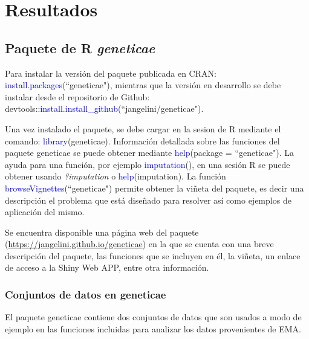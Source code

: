 

\chapter{Resultados}

\section{Paquete de R \emph{geneticae}}

Para instalar la versión del paquete publicada en CRAN: \textcolor{blue}{install.packages}(``geneticae"), mientras que la versión en desarrollo se debe instalar desde el repositorio de Github: devtools::\textcolor{blue}{install.install_github}(``jangelini/geneticae"). 

Una vez instalado el paquete, se debe cargar en la sesion de R mediante el comando: \textcolor{blue}{library}(geneticae). Información detallada sobre las funciones del paquete geneticae se puede obtener mediante \textcolor{blue}{help}(package = ``geneticae"). La ayuda para una función, por ejemplo \textcolor{blue}{imputation}(), en una sesión R se puede obtener usando \emph{?imputation} o \textcolor{blue}{help}(imputation). La función \textcolor{blue}{browseVignettes}(``geneticae") permite obtener la viñeta del paquete, es decir una descripción el problema que está diseñado para resolver así como ejemplos de aplicación del mismo. 

Se encuentra disponible una página web del paquete (\url{https://jangelini.github.io/geneticae}) en la que se cuenta con una breve descripción del paquete, las funciones que se incluyen en él, la viñeta, un enlace de acceso a la Shiny Web APP, entre otra información.


\subsection{Conjuntos de datos en geneticae}

El paquete geneticae contiene dos conjuntos de datos que son usados a modo de ejemplo en las funciones incluidas para analizar los datos provenientes de EMA.

